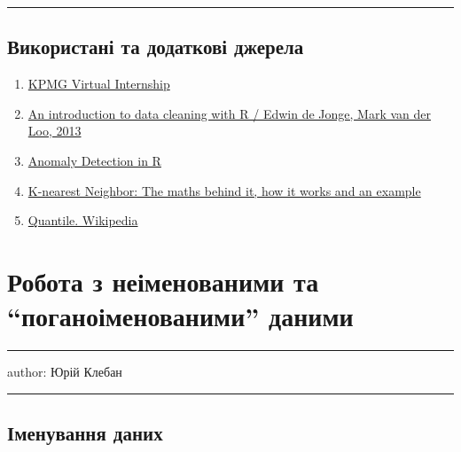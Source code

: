 \documentclass[
  letterpaper,
  DIV=11,
  numbers=noendperiod]{scrreprt}
\providecommand{\tightlist}{%
  \setlength{\itemsep}{0pt}\setlength{\parskip}{0pt}}\usepackage{longtable,booktabs,array}
\begin{document}
\begin{center}\rule{0.5\linewidth}{0.5pt}\end{center}

\section{Використані та додаткові
джерела}\label{ux432ux438ux43aux43eux440ux438ux441ux442ux430ux43dux456-ux442ux430-ux434ux43eux434ux430ux442ux43aux43eux432ux456-ux434ux436ux435ux440ux435ux43bux430}

\begin{enumerate}
\def\labelenumi{\arabic{enumi}.}
\tightlist
\item
  \href{https://www.insidesherpa.com/virtual-internships/m7W4GMqeT3bh9Nb2c}{KPMG
  Virtual Internship}
\item
  \href{https://cran.r-project.org/doc/contrib/de_Jonge+van_der_Loo-Introduction_to_data_cleaning_with_R.pdf}{An
  introduction to data cleaning with R / Edwin de Jonge, Mark van der
  Loo, 2013}
\item
  \href{datacamp.com/courses/anomaly-detection-in-r}{Anomaly Detection
  in R}
\item
  \href{https://medium.com/analytics-vidhya/k-nearest-neighbor-the-maths-behind-it-how-it-works-and-an-example-f1de1208546c}{K-nearest
  Neighbor: The maths behind it, how it works and an example}
\item
  \href{https://en.wikipedia.org/wiki/Quantile}{Quantile. Wikipedia}
\end{enumerate}

\chapter{Робота з неіменованими та ``поганоіменованими''
даними}\label{ux440ux43eux431ux43eux442ux430-ux437-ux43dux435ux456ux43cux435ux43dux43eux432ux430ux43dux438ux43cux438-ux442ux430-ux43fux43eux433ux430ux43dux43eux456ux43cux435ux43dux43eux432ux430ux43dux438ux43cux438-ux434ux430ux43dux438ux43cux438}

\begin{center}\rule{0.5\linewidth}{0.5pt}\end{center}

author: Юрій Клебан

\begin{center}\rule{0.5\linewidth}{0.5pt}\end{center}

\section{Іменування
даних}\label{ux456ux43cux435ux43dux443ux432ux430ux43dux43dux44f-ux434ux430ux43dux438ux445}
\end{document}
